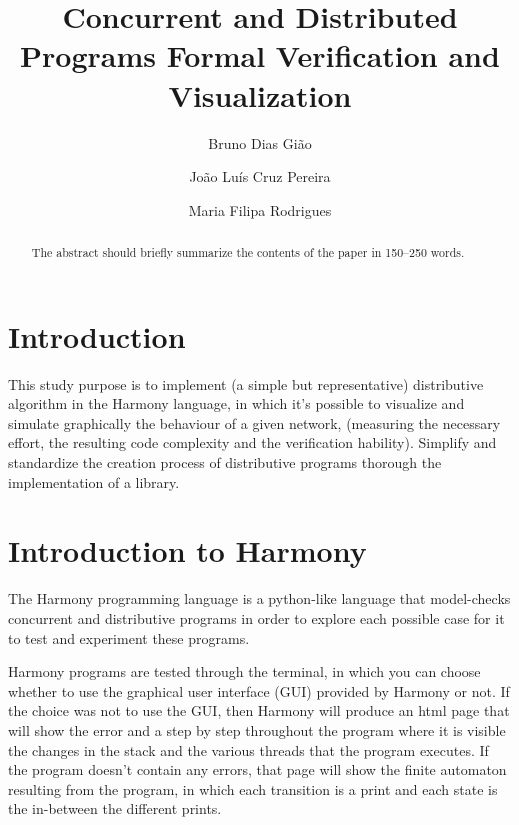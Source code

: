 \documentclass[runningheads]{llncs}
\begin{document}
%
\title{Concurrent and Distributed Programs Formal Verification and Visualization}
%
%
\author{Bruno Dias Gião \and
João Luís Cruz Pereira \and
Maria Filipa Rodrigues}
%

%
\maketitle              %
%
\begin{abstract}
The abstract should briefly summarize the contents of the paper in
150--250 words.

\end{abstract}
%
%
%
\section{Introduction}

This study purpose is to implement (a simple but representative) distributive algorithm in the Harmony language,
in which it's possible to visualize and simulate graphically the behaviour of a given network,
(measuring the necessary effort, the resulting code complexity and the verification hability).
Simplify and standardize the creation process of distributive programs thorough the implementation of a library.

\section{Introduction to Harmony}

The Harmony programming language is a python-like language that model-checks concurrent and
distributive programs in order to explore each possible case for it to test and experiment these programs.

Harmony programs are tested through the terminal, in which you can choose whether to use the graphical user
interface (GUI) provided by Harmony or not. If the choice was not to use the GUI, then Harmony will produce
an html page that will show the error and a step by step throughout the program where it is visible the
changes in the stack and the various threads that the program executes. If the program doesn't contain
any errors, that page will show the finite automaton resulting from the program, in which each transition
is a print and each state is the in-between the different prints.
\end{document}
